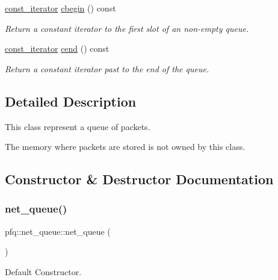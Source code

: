 \begin{DoxyCompactItemize}
\hyperlink{structpfq_1_1net__queue_1_1const__iterator}{const\+\_\+iterator} \hyperlink{classpfq_1_1net__queue_a9982c6ba98df15e89f0cb8bb6d9add0e}{cbegin} () const
\begin{DoxyCompactList}\small\item\em Return a constant iterator to the first slot of an non-\/empty queue. \end{DoxyCompactList}\item 
\hyperlink{structpfq_1_1net__queue_1_1const__iterator}{const\+\_\+iterator} \hyperlink{classpfq_1_1net__queue_ae8bf00c5db4e81f8c0a2c45c12f16768}{cend} () const
\begin{DoxyCompactList}\small\item\em Return a constant iterator past to the end of the queue. \end{DoxyCompactList}\end{DoxyCompactItemize}


\subsection{Detailed Description}
This class represent a queue of packets. 

The memory where packets are stored is not owned by this class. 

\subsection{Constructor \& Destructor Documentation}
\mbox{\label{classpfq_1_1net__queue_a1306ad9a1587c85ac3bafc552667a578}} 
\subsubsection{\texorpdfstring{net\+\_\+queue()}{net\_queue()}\hspace{0.1cm}{\footnotesize\ttfamily [1/3]}}
{\footnotesize\ttfamily pfq\+::net\+\_\+queue\+::net\+\_\+queue (\begin{DoxyParamCaption}{ }\end{DoxyParamCaption})\hspace{0.3cm}{\ttfamily [inline]}}



Default Constructor. 

\mbox{\label{classpfq_1_1net__queue_a3e98f8f2ae6dfd4a0e7d28734601d307}} 
